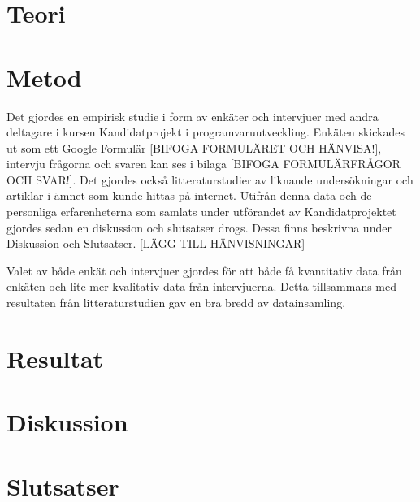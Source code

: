 \section{Teori}
\label{sec:theory-person}


\section{Metod}
\label{sec:method-person}

Det gjordes en empirisk studie i form av enkäter och intervjuer med andra deltagare i kursen Kandidatprojekt i programvaruutveckling. Enkäten skickades ut som ett Google Formulär [BIFOGA FORMULÄRET OCH HÄNVISA!], intervju frågorna och svaren kan ses i bilaga [BIFOGA FORMULÄRFRÅGOR OCH SVAR!]. Det gjordes också litteraturstudier av liknande undersökningar och artiklar i ämnet som kunde hittas på internet. Utifrån denna data och de personliga erfarenheterna som samlats under utförandet av Kandidatprojektet gjordes sedan en diskussion och slutsatser drogs. Dessa finns beskrivna under Diskussion och Slutsatser. [LÄGG TILL HÄNVISNINGAR]

Valet av både enkät och intervjuer gjordes för att både få kvantitativ data från enkäten och lite mer kvalitativ data från intervjuerna. Detta tillsammans med resultaten från litteraturstudien gav en bra bredd av datainsamling.

\section{Resultat}
\label{sec:results-person}


\section{Diskussion}
\label{sec:discussion-person}


\section{Slutsatser}
\label{sec:conclusions-person}


